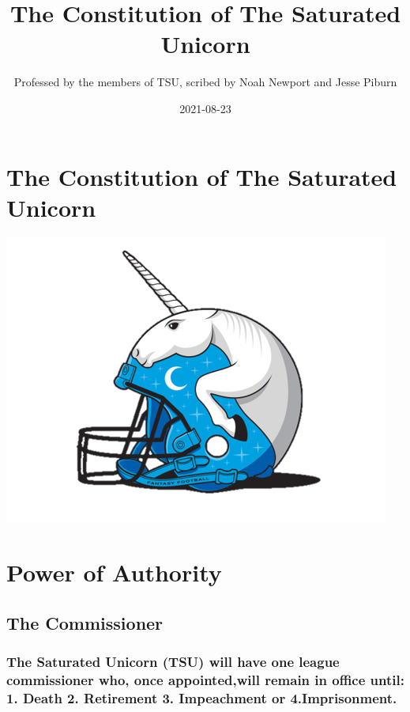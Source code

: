 \documentclass[
]{book}
\title{The Constitution of The Saturated Unicorn}
\author{Professed by the members of TSU, scribed by Noah Newport and Jesse Piburn}
\date{2021-08-23}
\begin{document}
\maketitle

{
\setcounter{tocdepth}{1}
\tableofcontents
}
\hypertarget{the-constitution-of-the-saturated-unicorn}{%
\chapter*{The Constitution of The Saturated Unicorn}\label{the-constitution-of-the-saturated-unicorn}}

\includegraphics[width=0.9\linewidth]{images/tsu-logo}

\hypertarget{power-of-authority}{%
\chapter{Power of Authority}\label{power-of-authority}}

\hypertarget{the-commissioner}{%
\section{The Commissioner}\label{the-commissioner}}

\hypertarget{the-saturated-unicorn-tsu-will-have-one-league-commissioner-who-once-appointedwill-remain-in-office-until-1.-death-2.-retirement-3.-impeachment-or-4.imprisonment.}{%
\subsection{The Saturated Unicorn (TSU) will have one league commissioner who, once appointed,will remain in office until: 1. Death 2. Retirement 3. Impeachment or 4.Imprisonment.}\label{the-saturated-unicorn-tsu-will-have-one-league-commissioner-who-once-appointedwill-remain-in-office-until-1.-death-2.-retirement-3.-impeachment-or-4.imprisonment.}}
\end{document}
